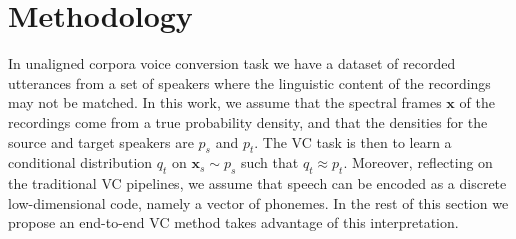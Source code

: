 \documentclass{article}
\begin{document}




\section{Methodology}
\label{sec:methodology}


In unaligned corpora voice conversion task we have a dataset of recorded utterances from a set of speakers where the linguistic content of the recordings may not be matched.
In this work, we assume that the spectral frames $\mathbf{x}$ of the recordings come from a true probability density, and that the densities for the source and target speakers are $p_s$ and $p_t$. The VC task is then to learn a conditional distribution $q_t$ on $\mathbf{x}_s \sim p_s$ such that $q_t \approx p_t$.
Moreover, reflecting on the traditional VC pipelines, we assume that speech can be encoded as a discrete low-dimensional code, namely a vector of phonemes. In the rest of this section we propose an end-to-end VC method takes advantage of this interpretation.
\end{document}
